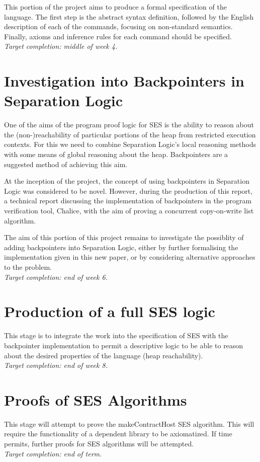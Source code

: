 \documentclass[a4paper]{report}
\begin{document}
  This portion of the project aims to produce a formal specification of the
  language. The first step is the abstract syntax definition, followed by the
  English description of each of the commands, focusing on non-standard
  semantics. Finally, axioms and inference rules for each command should be
  specified.
  \\
  \emph{Target completion: middle of week 4.}

  \section{Investigation into Backpointers in Separation Logic}
  One of the aims of the program proof logic for SES is the ability to reason
  about the (non-)reachability of particular portions of the heap from
  restricted execution contexts. For this we need to combine Separation Logic's
  local reasoning methods with some means of global reasoning about the heap.
  Backpointers are a suggested method of achieving this aim.

  At the inception of the project, the concept of using backpointers in
  Separation Logic was considered to be novel. However, during the production of
  this report, a technical report \cite{KassiosKritikos12} discussing the
  implementation of backpointers in the program verification tool, Chalice, with
  the aim of proving a concurrent copy-on-write list algorithm.

  The aim of this portion of this project remains to investigate the possiblity
  of adding backpointers into Separation Logic, either by further formalising
  the implementation given in this new paper, or by considering alternative
  approaches to the problem.
  \\
  \emph{Target completion: end of week 6.}

  \section{Production of a full SES logic}
  This stage is to integrate the work into the specification of SES with the
  backpointer implementation to permit a descriptive logic to be able to reason
  about the desired properties of the language (heap reachability).
  \\
  \emph{Target completion: end of week 8.}

  \section{Proofs of SES Algorithms}
  This stage will attempt to prove the makeContractHost SES
  algorithm\cite{contract-host-algo}. This will
  require the functionality of a dependent library to be axiomatized. If time
  permits, further proofs for SES algorithms will be attempted.
  \\
  \emph{Target completion: end of term.}
\end{document}
